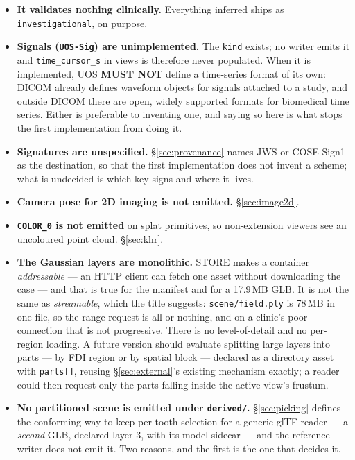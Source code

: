 \documentclass[11pt,a4paper]{article}
\newcommand{\MUSTNOT}{\textcolor{uosred}{\textbf{MUST NOT}}}
\newcommand{\code}[1]{\texttt{\small #1}}
\begin{document}
\begin{itemize}
  \item \textbf{It validates nothing clinically.} Everything inferred ships as
  \code{investigational}, on purpose.
  \item \textbf{Signals (\code{UOS-Sig}) are unimplemented.} The \code{kind} exists; no
  writer emits it and \code{time\_cursor\_s} in views is therefore never populated. When it
  is implemented, UOS \MUSTNOT{} define a time-series format of its own: DICOM already
  defines waveform objects for signals attached to a study, and outside DICOM there are
  open, widely supported formats for biomedical time series. Either is preferable to
  inventing one, and saying so here is what stops the first implementation from doing it.
  \item \textbf{Signatures are unspecified.} \S\ref{sec:provenance} names JWS or COSE
  Sign1 as the destination, so that the first implementation does not invent a scheme; what
  is undecided is which key signs and where it lives.
  \item \textbf{Camera pose for 2D imaging is not emitted.} \S\ref{sec:image2d}.
  \item \textbf{\code{COLOR\_0} is not emitted} on splat primitives, so non-extension
  viewers see an uncoloured point cloud. \S\ref{sec:khr}.
  \item \textbf{The Gaussian layers are monolithic.} STORE makes a container
  \emph{addressable} --- an HTTP client can fetch one asset without downloading the case ---
  and that is true for the manifest and for a 17.9\,MB GLB. It is not the same as
  \emph{streamable}, which the title suggests: \code{scene/field.ply} is 78\,MB in one file,
  so the range request is all-or-nothing, and on a clinic's poor connection that is not
  progressive. There is no level-of-detail and no per-region loading. A future version
  should evaluate splitting large layers into parts --- by FDI region or by spatial block ---
  declared as a directory asset with \code{parts[]}, reusing \S\ref{sec:external}'s existing
  mechanism exactly; a reader could then request only the parts falling inside the active
  view's frustum.
  \item \textbf{No partitioned scene is emitted under \code{derived/}.}
  \S\ref{sec:picking} defines the conforming way to keep per-tooth selection for a generic
  glTF reader --- a \emph{second} GLB, declared layer 3, with its model sidecar --- and the
  reference writer does not emit it. Two reasons, and the first is the one that decides it.

\end{itemize}
\end{document}
